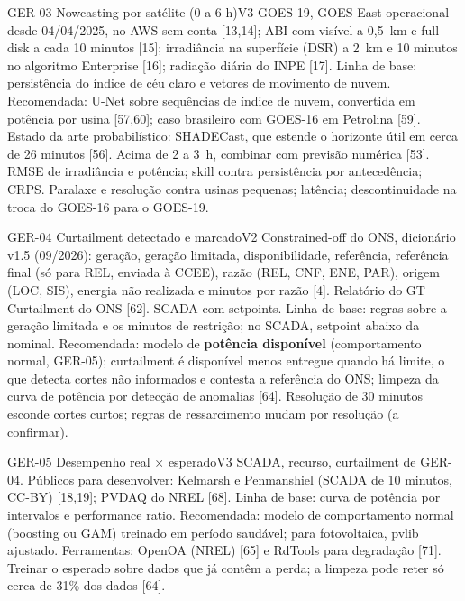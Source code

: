 \begin{ficha}{GER-03 \textperiodcentered{} Nowcasting por satélite (0 a 6 h)}{V3}
 GOES-19, GOES-East operacional desde 04/04/2025, no AWS sem
conta [13,14]; ABI com visível a 0,5~km e full disk a cada 10 minutos [15];
irradiância na superfície (DSR) a 2~km e 10 minutos no algoritmo Enterprise
[16]; radiação diária do INPE [17].
 Linha de base: persistência do índice de céu claro e
vetores de movimento de nuvem. Recomendada: U-Net sobre sequências de índice
de nuvem, convertida em potência por usina [57,60]; caso brasileiro com
GOES-16 em Petrolina [59]. Estado da arte probabilístico: SHADECast, que
estende o horizonte útil em cerca de 26 minutos [56]. Acima de 2 a 3~h,
combinar com previsão numérica [53].
 RMSE de irradiância e potência; skill contra persistência
por antecedência; CRPS.
 Paralaxe e resolução contra usinas pequenas; latência;
descontinuidade na troca do GOES-16 para o GOES-19.
\end{ficha}

\begin{ficha}{GER-04 \textperiodcentered{} Curtailment detectado e marcado}{V2}
 Constrained-off do ONS, dicionário v1.5 (09/2026): geração,
geração limitada, disponibilidade, referência, referência final (só para
REL, enviada à CCEE), razão (REL, CNF, ENE, PAR), origem (LOC, SIS), energia
não realizada e minutos por razão [4]. Relatório do GT Curtailment do ONS
[62]. SCADA com setpoints.
 Linha de base: regras sobre a geração limitada e os
minutos de restrição; no SCADA, setpoint abaixo da nominal. Recomendada:
modelo de \textbf{potência disponível} (comportamento normal, GER-05);
curtailment é disponível menos entregue quando há limite, o que detecta
cortes não informados e contesta a referência do ONS; limpeza da curva de
potência por detecção de anomalias [64].
 Resolução de 30 minutos esconde cortes curtos; regras de
ressarcimento mudam por resolução (a confirmar).
\end{ficha}

\begin{ficha}{GER-05 \textperiodcentered{} Desempenho real × esperado}{V3}
 SCADA, recurso, curtailment de GER-04. Públicos para
desenvolver: Kelmarsh e Penmanshiel (SCADA de 10 minutos, CC-BY) [18,19];
PVDAQ do NREL [68].
 Linha de base: curva de potência por intervalos e
performance ratio. Recomendada: modelo de comportamento normal (boosting ou
GAM) treinado em período saudável; para fotovoltaica, pvlib ajustado.
Ferramentas: OpenOA (NREL) [65] e RdTools para degradação [71].
 Treinar o esperado sobre dados que já contêm a perda; a
limpeza pode reter só cerca de 31\% dos dados [64].
\end{ficha}

